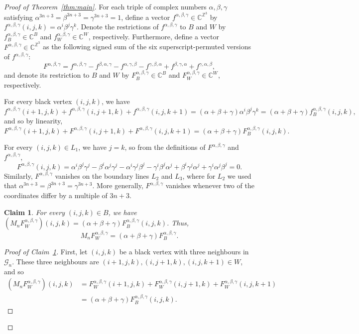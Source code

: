 \documentclass{article}
\newtheorem{claim}[theorem]{Claim}
\begin{document}
\begin{proof}[Proof of Theorem~\ref{thm:main}]
For each triple of complex numbers $\alpha,\beta,\gamma$ satisfying $\alpha^{3n+3}=\beta^{3n+3}=\gamma^{3n+3}=1$, define a vector $f^{\alpha,\beta,\gamma}\in\mathbb{C}^{\mathbb{Z}^3}$ by $f^{\alpha,\beta,\gamma}(i,j,k)=\alpha^i\beta^j\gamma^k$. Denote the restrictions of $f^{\alpha,\beta,\gamma}$ to $B$ and $W$ by $f_B^{\alpha,\beta,\gamma}\in\mathbb{C}^B$ and $f_W^{\alpha,\beta,\gamma}\in\mathbb{C}^W$, respectively. Furthermore, define a vector $F^{\alpha,\beta,\gamma}\in\mathbb{C}^{\mathbb{Z}^3}$ as the following signed sum of the six superscript-permuted versions of $f^{\alpha,\beta,\gamma}$:
\[F^{\alpha,\beta,\gamma}=f^{\alpha,\beta,\gamma}-f^{\beta,\alpha,\gamma}-f^{\alpha,\gamma,\beta}-f^{\gamma,\beta,\alpha}+f^{\beta,\gamma,\alpha}+f^{\gamma,\alpha,\beta},\]
and denote its restriction to $B$ and $W$ by $F_B^{\alpha,\beta,\gamma}\in\mathbb{C}^B$ and $F_W^{\alpha,\beta,\gamma}\in\mathbb{C}^W$, respectively.

For every black vertex $(i,j,k)$, we have
\[f^{\alpha,\beta,\gamma}(i+1,j,k)+f^{\alpha,\beta,\gamma}(i,j+1,k)+f^{\alpha,\beta,\gamma}(i,j,k+1)=(\alpha+\beta+\gamma)\alpha^i\beta^j\gamma^k=(\alpha+\beta+\gamma)f_B^{\alpha,\beta,\gamma}(i,j,k),\]
and so by linearity, 
\[F^{\alpha,\beta,\gamma}(i+1,j,k)+F^{\alpha,\beta,\gamma}(i,j+1,k)+F^{\alpha,\beta,\gamma}(i,j,k+1)=(\alpha+\beta+\gamma)F_B^{\alpha,\beta,\gamma}(i,j,k).\]

For every $(i,j,k)\in L_1$, we have $j=k$, so from the definitions of $F^{\alpha,\beta,\gamma}$ and $f^{\alpha,\beta,\gamma}$,
\[F^{\alpha,\beta,\gamma}(i,j,k)=\alpha^i\beta^j\gamma^j-\beta^i\alpha^j\gamma^j-\alpha^i\gamma^j\beta^j-\gamma^i\beta^j\alpha^j+\beta^i\gamma^j\alpha^j+\gamma^i\alpha^j\beta^j=0.\]
Similarly,  $F^{\alpha,\beta,\gamma}$ vanishes on the boundary lines $L_2$ and $L_3$, where for $L_2$ we used that $\alpha^{3n+3}=\beta^{3n+3}=\gamma^{3n+3}$. More generally, $F^{\alpha,\beta,\gamma}$ vanishes whenever two of the coordinates differ by a multiple of $3n+3$.

\begin{claim}\label{claim:eigen}
For every $(i,j,k)\in B$, we have $(M_nF_W^{\alpha,\beta,\gamma})(i,j,k)=(\alpha+\beta+\gamma)F_B^{\alpha,\beta,\gamma}(i,j,k)$. Thus,
\[M_nF_W^{\alpha,\beta,\gamma}=(\alpha+\beta+\gamma)F_B^{\alpha,\beta,\gamma}.\]
\end{claim}
\begin{proof}[Proof of Claim~\ref{claim:eigen}]
First, let $(i,j,k)$ be a black vertex with three neighbours in $\mathcal{G}_n$. These three neighbours are $(i+1,j,k),(i,j+1,k),(i,j,k+1)\in W$, and so 
\begin{align*}
(M_nF_W^{\alpha,\beta,\gamma})(i,j,k)&=F_W^{\alpha,\beta,\gamma}(i+1,j,k)+F_W^{\alpha,\beta,\gamma}(i,j+1,k)+F_W^{\alpha,\beta,\gamma}(i,j,k+1)\\
&=(\alpha+\beta+\gamma)F_B^{\alpha,\beta,\gamma}(i,j,k).
\end{align*}


\end{proof}
\end{proof}
\end{document}
